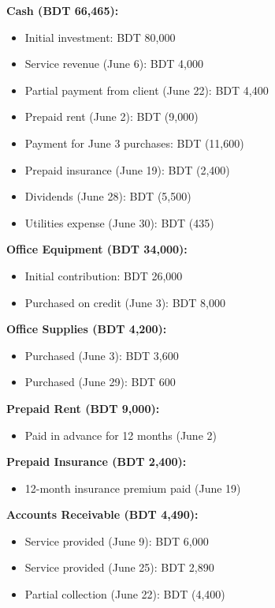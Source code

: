 \documentclass[12pt,a4paper]{book}
\begin{document}
\begin{multicols}{2}

    \textbf{Cash (BDT 66,465):}
    \begin{itemize}
        \item Initial investment: BDT 80,000
        \item Service revenue (June 6): BDT 4,000
        \item Partial payment from client (June 22): BDT 4,400
        \item Prepaid rent (June 2): BDT (9,000)
        \item Payment for June 3 purchases: BDT (11,600)
        \item Prepaid insurance (June 19): BDT (2,400)
        \item Dividends (June 28): BDT (5,500)
        \item Utilities expense (June 30): BDT (435)
    \end{itemize}
    
    \textbf{Office Equipment (BDT 34,000):}
    \begin{itemize}
        \item Initial contribution: BDT 26,000
        \item Purchased on credit (June 3): BDT 8,000
    \end{itemize}
    
    \textbf{Office Supplies (BDT 4,200):}
    \begin{itemize}
        \item Purchased (June 3): BDT 3,600
        \item Purchased (June 29): BDT 600
    \end{itemize}
    
    \textbf{Prepaid Rent (BDT 9,000):}
    \begin{itemize}
        \item Paid in advance for 12 months (June 2)
    \end{itemize}
    
    \textbf{Prepaid Insurance (BDT 2,400):}
    \begin{itemize}
        \item 12-month insurance premium paid (June 19)
    \end{itemize}
    
    \textbf{Accounts Receivable (BDT 4,490):}
    \begin{itemize}
        \item Service provided (June 9): BDT 6,000
        \item Service provided (June 25): BDT 2,890
        \item Partial collection (June 22): BDT (4,400)
    \end{itemize}
    

\end{multicols}
\end{document}
